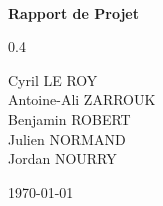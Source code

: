 \documentclass{exia_report}
\begin{document}
\begin{titlepage}
	\begin{center}

		\hfill \\[5cm]
		{ \huge \bfseries Rapport de Projet }

		\begin{minipage}
		\vfill{0.4\textwidth}
			\begin{center}
				\large
				Cyril LE ROY \\
				Antoine-Ali ZARROUK \\
				Benjamin ROBERT \\
				Julien NORMAND \\
				Jordan NOURRY
			\end{center}
		\end{minipage}

		{ \vfill \large \today }

	\end{center}
\end{titlepage}

\clearpage
\tableofcontents

\clearpage


\clearpage


\clearpage


\clearpage

\end{document}
